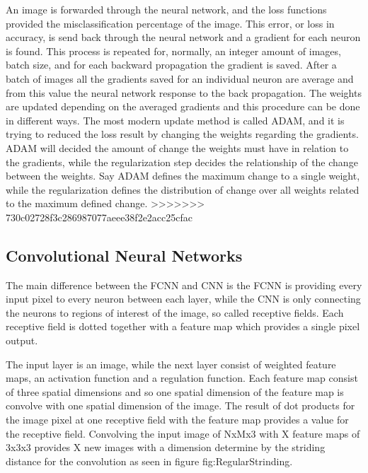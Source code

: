 An image is forwarded through the neural network, and the loss functions provided the misclassification percentage of the image. This error, or loss in accuracy, is send back through the neural network and a gradient for each neuron is found. This process is repeated for, normally, an integer amount of images, batch size, and for each backward propagation the gradient is saved. After a batch of images all the gradients saved for an individual neuron are average and from this value the neural network response to the back propagation. The weights are updated depending on the averaged gradients and this procedure can be done in different ways. The most modern update method is called ADAM, and it is trying to reduced the loss result by changing the weights regarding the gradients. ADAM will decided the amount of change the weights must have in relation to the gradients, while the regularization step decides the relationship of the change between the weights. Say ADAM defines the maximum change to a single weight, while the regularization defines the distribution of change over all weights related to the maximum defined change.
>>>>>>> 730c02728f3c286987077aeee38f2e2acc25cfac

\FloatBarrier

\subsection{Convolutional Neural Networks}

The main difference between the FCNN and CNN is the FCNN is providing every input pixel to every neuron between each layer, while the CNN is only connecting the neurons to regions of interest of the image, so called receptive fields. Each receptive field is dotted together with a feature map which provides a single pixel output.

The input layer is an image, while the next layer consist of weighted feature maps, an activation function and a regulation function. Each feature map consist of three spatial dimensions and so one spatial dimension of the feature map is convolve with one spatial dimension of the image. The result of dot products for the image pixel at one receptive field with the feature map provides a value for the receptive field. Convolving the input image of NxMx3 with X feature maps of 3x3x3 provides X new images with a dimension determine by the striding distance for the convolution as seen in figure fig:RegularStrinding.


